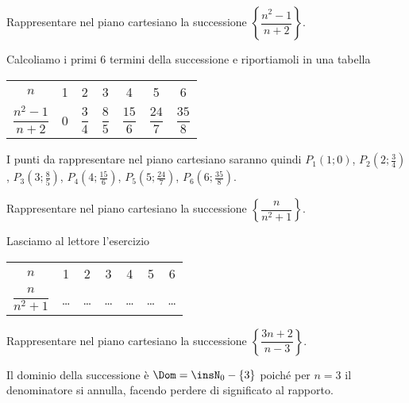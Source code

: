 \begin{exrig}
\begin{esempio}
Rappresentare nel piano cartesiano la successione $\left\{\dfrac{n^2-1}{n+2}\right\}$.

Calcoliamo i primi 6 termini della successione e riportiamoli in una tabella
\begin{center}
\begin{tabular} {*{7}{c}}
\toprule
$n$ & 1 & 2 & 3 & 4 & 5 & 6\\
$\dfrac{n^2-1}{n+2}$ & 0 & $\dfrac{3}{4}$ & $\dfrac{8}{5}$ & $\dfrac{15}{6}$ & $\dfrac{24}{7}$ & $\dfrac{35}{8}$\\
\bottomrule
\end{tabular}
\end{center}
I punti da rappresentare nel piano cartesiano saranno quindi $P_1(1;0)$, $P_2\left(2;\frac{3}{4}\right)$, $P_3\left(3;\frac{8}{5}\right)$, $P_4\left(4;\frac{15}{6}\right)$, $P_5\left(5;\frac{24}{7}\right)$, $P_6\left(6;\frac{35}{8}\right)$.
\begin{center}
 
\end{center}
\end{esempio}

\begin{esempio}
Rappresentare nel piano cartesiano la successione $\left\{\dfrac{n}{n^2+1}\right\}$.

Lasciamo al lettore l'esercizio
\begin{center}
\begin{tabular} {*{7}{c}}
\toprule
$n$ & 1 & 2 & 3 & 4 & 5 & 6\\
$\dfrac{n}{n^2+1}$ & \ldots & \ldots & \ldots & \ldots & \ldots & \ldots\\
\bottomrule
\end{tabular}
\end{center}

\begin{center}
 
\end{center}
\end{esempio}

\begin{esempio}
Rappresentare nel piano cartesiano la successione $\left\{\dfrac{3n+2}{n-3}\right\}$.

Il dominio della successione è $\Dom = \insN_0-\{3\}$ poiché per $n=3$ il denominatore si annulla, facendo perdere di significato al rapporto.


\end{esempio}
\end{exrig}
